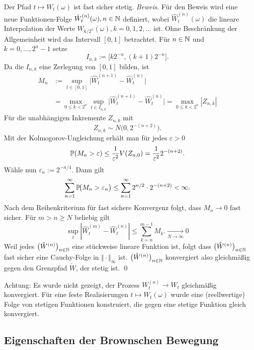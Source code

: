 \begin{satz}
Der Pfad $t \mapsto W_t(\omega)$ ist fast sicher stetig.
\textit{Beweis.}
Für den Beweis wird eine neue Funktionen-Folge $\hat W_t^{(n)}(\omega), n \in \Bbb N$
definiert, wobei $\hat W_t^{(n)}(\omega)$ die lineare Interpolation der Werte $W_{k/2^n}(\omega), k=0,1,2,\ldots$ ist. 
Ohne Beschränkung der Allgemeinheit wird das Intervall $[0,1]$ betrachtet. Für $n \in \Bbb N$ und $k=0,\dots,2^n-1$ setze
$$I_{n,k}:=\big[k2^{-n},(k+1)2^{-n}\big].$$
Da die $I_{n,k}$ eine Zerlegung von $[0,1]$ bilden, ist
$$
\begin{aligned}
M_n &:=\sup_{t\in[0,1]}\big|\hat W^{(n+1)}_t-\hat W^{(n)}_t\big| 
\\ &= \max_{0\le k<2^n} \sup_{t\in I_{n,k}} \big|\hat W^{(n+1)}_t-\hat W^{(n)}_t\big| =\max_{0\le k<2^n}|Z_{n,k}|
\end{aligned}
$$
Für die unabhängigen Inkremente $Z_{n,k}$ mit
$$Z_{n,k}\sim N\!\big(0,2^{-(n+2)}\big).$$
Mit der Kolmogorov-Ungleichung erhält man für jedes $\varepsilon>0$
$$
\Bbb P(M_n>\varepsilon) \le \frac{1}{\varepsilon^2} V(Z_{n,0}) = \frac{1}{\varepsilon^2} 2^{-(n+2)}.
$$
Wähle nun $\varepsilon_n:=2^{-n/4}$. Dann gilt
$$
\sum_{n=1}^\infty \Bbb P\!\big(M_n>\varepsilon_n\big)
\le \sum_{n=1}^\infty 2^{n/2} \cdot 2^{-(n+2)}<\infty.
$$
Nach dem Reihenkriterium für fast sichere Konvergenz folgt, dass $M_n\to 0$ fast sicher.
Für $m \gt n \ge N$ beliebig gilt
$$\sup_{t}|\hat W^{(m)}_t - \hat W^{(n)}_t| \leq \sum_{k=n}^{m-1} M_k. \underset{N \to \infty} \longrightarrow 0$$
Weil jedes $\big(\hat W^{(n)}\big)_{n\in\Bbb N}$ eine stückweise lineare Funktion ist, folgt
dass $\big(\hat W^{(n)}\big)_{n\in\Bbb N}$ fast sicher eine Cauchy-Folge in $\Vert \cdot \Vert_{\infty}$ ist.
$\big(\hat W^{(n)}\big)_{n\in\Bbb N}$ konvergiert also gleichmäßig gegen den Grenzpfad $\widetilde W$, der stetig ist. \qed

Achtung: Es wurde nicht gezeigt, der Prozess $W_t^{(n)} \longrightarrow W_t$ gleichmäßig konvergiert. Für eine feste Realisierungen
$t \mapsto W_t(\omega)$ wurde eine (reellwertige) Folge von stetigen Funktionen konstruiert, die gegen eine stetige Funktion gleich konvergiert.
\end{satz}

\subsection{Eigenschaften der Brownschen Bewegung}

